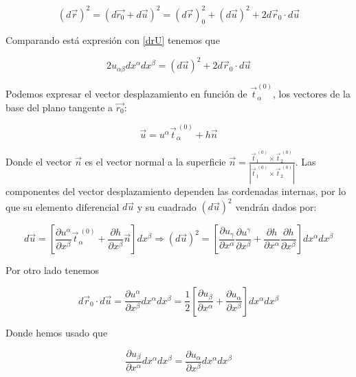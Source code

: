 \begin{equation}\label{dl_vectorial}
(d\vec{r})^2=(d\vec{r_0}+d\vec{u})^2=(d\vec{r})^2_0+(d\vec{u})^2+2d\vec{r}_0\cdot d\vec{u}
\end{equation}

Comparando está expresión con \eqref{drU} tenemos que

\begin{equation}\label{2udxdx}
2u_{\alpha\beta}dx^{\alpha}dx^{\beta}=(d\vec{u})^2+2d\vec{r}_0\cdot d\vec{u}
\end{equation}

Podemos expresar el vector desplazamiento en función de
$\vec{t}^{(0)}_{\alpha}$, los vectores de la base del plano tangente a $\vec{r_0}$:

\begin{equation*}
  \vec{u}=u^{\alpha}\vec{t}^{\ (0)}_{\alpha}+h\vec{n}
\end{equation*}

Donde el vector $\vec{n}$ es el vector normal a la superficie
$\vec{n}=\frac{\vec{t}^{\ (0)}_1\times \vec{t}_2^{\ (0)}}{|\vec{t}^{\
    (0)}_1\times \vec{t}_2^{\ (0)}|}$. Las componentes del vector
desplazamiento dependen las cordenadas internas, por lo que su elemento
diferencial $d\vec{u}$ y su cuadrado $(d\vec{u})^2$ vendrán dados por: 

\begin{equation}\label{du2}
d\vec{u}=\left[\frac{\partial
  u^{\alpha}}{\partial x^{\beta}}\vec{t}^{\ (0)}_{\alpha}+\frac{\partial
  h}{\partial x^{\beta}} \vec{n}\right]dx^{\beta}\Rightarrow
(d\vec{u})^2=\left[
\frac{\partial u_{\gamma}}{\partial x^{\alpha}}
\frac{\partial u^{\gamma}}{\partial x^{\beta}}+ 
\frac{\partial h}{\partial x^{\alpha}}
\frac{\partial h}{\partial x^{\beta}}\right]
dx^{\alpha}dx^{\beta} 
\end{equation}

Por otro lado tenemos

\begin{equation}\label{drdu}
d\vec{r}_0\cdot d\vec{u}=\frac{\partial u^{\alpha}}{\partial x^{\beta}}dx^{\alpha}dx^{\beta}=\frac{1}{2}\left[\frac{\partial u_{\beta}}{\partial x^{\alpha}}+ \frac{\partial u_{\alpha}}{\partial x^{\beta}}\right]dx^{\alpha}dx^{\beta} 
\end{equation}

Donde hemos usado que

 $$\frac{\partial u_{\beta}}{\partial
   x^{\alpha}}dx^{\alpha}dx^{\beta}=\frac{\partial u_{\alpha}}{\partial
   x^{\beta}}dx^{\alpha}dx^{\beta}$$

